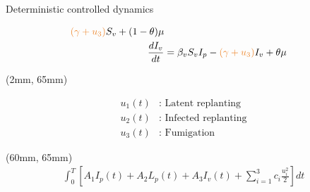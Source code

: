 \begin{frame}{Deterministic controlled dynamics}
\begin{textblock*}{63mm}
\begin{bluebox}{}
{\begin{align*}
                        \textcolor{cadmiumorange}{(\gamma + u_3)}
                        S_v + (1-\theta)\mu
                        \\
                    \frac{dI_v}{dt} &=
                        \beta_v S_v I_p - 
                        \textcolor{cadmiumorange}{(\gamma + u_3)} I_v 
                        + \theta\mu
                \end{align*}
            }
        \end{bluebox}
    \end{textblock*}
    \begin{textblock*}{55mm}(2mm, 65mm)
        \begin{yellowbox}{}
            \begin{align*}
                u_1(t)&:
                    \text{ Latent replanting}
                \\
                u_2(t)&:
                    \text{ Infected replanting}
                \\
                u_3(t)&:
                    \text{ Fumigation}
            \end{align*}
        \end{yellowbox}
    \end{textblock*}
    \begin{textblock*}{58mm}(60mm, 65mm)
        \begin{align*}
            \int_{0}^T
                \left[
                A_1 I_p(t) + A_2 L_p(t) + A_3 I_v(t)
                + \sum_{i=1}^3
                    c_i \frac{u_i ^ 2}{2}
                \right] dt
        \end{align*}
    \end{textblock*}
\end{frame}